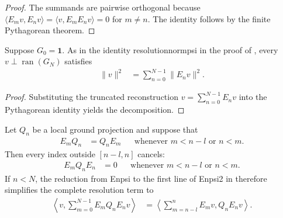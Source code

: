 \begin{proof}
    \leanok
    The summands are pairwise orthogonal because
    $\langle E_mv,E_nv\rangle=\langle v,E_mE_nv\rangle=0$ for $m\ne n$.
    The identity follows by the finite Pythagorean theorem.
\end{proof}

\begin{lemma}%
    \label{thm:martingale-difference-final-complement-norm-decomposition}
    \leanok
    Suppose $G_0=\mathbf 1$.  As in the identity \textup{resolutionnormpsi}
    in the proof of \cite[Theorem~2.1(i)]{Nachtergaele1996Spectral}, every
    $v\perp\operatorname{ran}(G_N)$ satisfies
    \begin{align}
        \lVert v\rVert^2
         & =\sum_{n=0}^{N-1}\lVert E_nv\rVert^2.
    \end{align}
\end{lemma}

\begin{proof}
    \leanok
    Substituting the truncated reconstruction
    $v=\sum_{n=0}^{N-1}E_nv$ into the Pythagorean identity yields the
    decomposition.
\end{proof}


\begin{lemma}%
    \label{thm:outside-window-martingale-cancellation}
    \leanok
    Let $Q_n$ be a local ground projection and suppose that
    \begin{align}
        E_mQ_n & =Q_nE_m
               &         & \text{whenever }m<n-l\text{ or }n<m.
    \end{align}
    Then every index outside $[n-l,n]$ cancels:
    \begin{align}
        E_mQ_nE_n & =0
                  &    & \text{whenever }m<n-l\text{ or }n<m.
    \end{align}
    If $n<N$, the reduction from \textup{Enpsi} to the first line of
    \textup{Enpsi2} in \cite[Theorem~2.1(i)]{Nachtergaele1996Spectral}
    therefore simplifies the complete resolution term to
    \begin{align}
        \left\langle v,
        \sum_{m=0}^{N-1}E_mQ_nE_nv\right\rangle
         & =\left\langle
        \sum_{m=n-l}^{n}E_mv,Q_nE_nv\right\rangle.
    \end{align}
\end{lemma}

